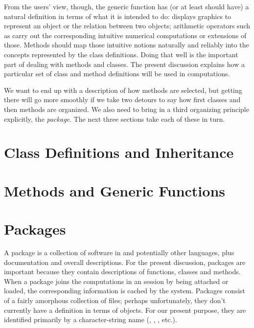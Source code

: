 \documentclass[11pt]{article}
\begin{document}
From the users' view, though, the generic function has (or at least should have) a natural definition in terms of what it is intended to do:   displays graphics to represent an object or the relation between two objects; arithmetic operators such as \SOperator{+} carry out the corresponding intuitive numerical computations or extensions of those.
Methods should map those intuitive notions naturally and reliably into the concepts represented by the class definitions.
Doing that well is the important part of dealing with methods and classes.
The present discussion explains how a particular set of class and method definitions will be used in computations.

We want to end up with a description of how methods are selected, but getting there will go more smoothly if we take two detours to say how first classes  and then  methods are organized.
We also need to bring in a third organizing principle explicitly, the \R{} \emph{package}.
The next three sections take each of these in turn.

\section{Class Definitions and Inheritance}
\label{sec:class-defin-inher}

\section{Methods and Generic Functions}
\label{sec:meth-gener-funct}

\section{Packages}
\label{sec:packages}

A package is a collection of software in \R{} and potentially other languages, plus documentation and overall descriptions.
For the present discussion, packages are important because they contain descriptions of functions, classes and methods.
When a package joins the computations in an \R{} session by being attached or loaded, the corresponding information is cached by the \R{} system.
Packages consist of a fairly amorphous collection of files; perhaps unfortunately, they don't currently have a definition in terms of objects.
For our present purpose, they are identified primarily by a character-string name (, , , etc.).
\end{document}
